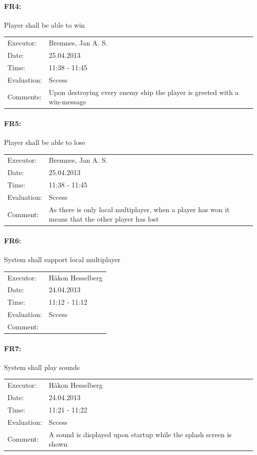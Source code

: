 \documentclass[12pt, a4paper]{article}
\begin{document}
\paragraph{FR4:} Player shall be able to win\\
\begin{tabular}{  p{}  p{} }
    Executor: & Bremnes, Jan A. S. \\
    Date: & 25.04.2013 \\
    Time: & 11:38 - 11:45  \\
    Evaluation: & Sccess \\
	Comments: & Upon destroying every enemy ship the player is greeted with a
win-message\\
\end{tabular}

\paragraph{FR5:}  Player shall be able to lose\\
\begin{tabular}{  p{}  p{} }
    Executor: & Bremnes, Jan A. S. \\
    Date: & 25.04.2013 \\
    Time: & 11:38 - 11:45  \\
    Evaluation: & Sccess \\
    Comment: & 
As there is only local multiplayer, when a player has won it means that the
other player has lost \\
\end{tabular}

\paragraph{FR6:} System shall support local multiplayer\\
\begin{tabular}{  p{}  p{} }
    Executor: & Håkon Hesselberg  \\
    Date: & 24.04.2013 \\
    Time: & 11:12 - 11:12  \\
    Evaluation: & Sccess \\
	Comment: &

\end{tabular}

\paragraph{FR7:} System shall play sounds\\
\begin{tabular}{  p{}  p{} }
    Executor: & Håkon Hesselberg  \\
    Date: & 24.04.2013 \\
    Time: & 11:21 - 11:22  \\
    Evaluation: & Sccess \\
	Comment: &
A sound is displayed upon startup while the splash screen is shown\\
\end{tabular}
\end{document}
